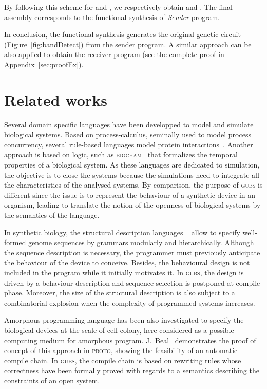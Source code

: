\documentclass{eptcs}
\newcounter{ti}
\begin{document}
By following this scheme for  and , we respectively obtain  and .
The final assembly corresponds to the functional synthesis of \textit{Sender} program. 

In conclusion, the functional synthesis generates the original genetic circuit (Figure~\ref{fig:bandDetect}) from the sender program. A similar approach can be also applied to obtain the receiver program (see the complete proof in Appendix~\ref{sec:proofEx}).


\section{Related works}
\label{sec:related}
Several domain specific languages have been developped to model and simulate biological systems. 
Based on process-calculus, seminally used to model process concurrency, several rule-based languages model protein interactions~\cite{Priami2001,Danos07,Ciocchetta2009}. Another approach is based on logic, such as \textsc{biocham}~\cite{Calzone2006} that formalizes the temporal properties of a biological system. As these languages are dedicated to simulation, the objective is to close the systems because the simulations need to integrate all the characteristics of the analysed systems. By comparison, the purpose of \textsc{gubs} is different since the issue is to represent the behaviour of a synthetic device in an organism, leading to translate the notion of the openness of biological systems by the semantics of the language.

In synthetic biology, the structural description languages ~\cite{Czar2009,Pedersen2009a,Bilitchenko2011} allow to specify 
 well-formed genome sequences by grammars modularly and hierarchically. Although the sequence description is necessary, the programmer must previously anticipate the behaviour of the device to conceive. Besides, the behavioural design is not included in the program while it initially motivates it. In \textsc{gubs}, the design is driven by a behaviour description and sequence selection is postponed at compile phase. Moreover, the size of the structural description is also subject to a combinatorial explosion when the complexity of programmed systems increases.

Amorphous programming language has been also investigated to specify the biological devices at the scale of cell colony, here considered as a possible computing medium for amorphous program. J.~Beal~\cite{Beal2011} demonstrates the proof of concept of this approach in \textsc{proto}, showing the feasibility of an automatic compile chain. In \textsc{gubs}, the compile chain is based on rewriting rules whose correctness have been formally proved with regards to a semantics describing the constraints of an open system.
\end{document}
